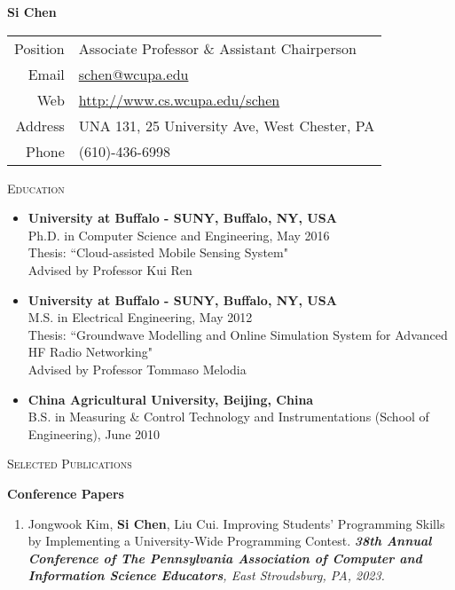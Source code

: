 \documentclass[letter]{article}
\newcommand{\heading}[1]{\item \large \textsc{#1} \normalsize}
\newcommand{\publication}[4]{\item #1. #2. \emph{#3.} #4}
\begin{document}
\Huge \textbf{Si Chen} \hfill \small
\begin{tabular}{rl}
Position & Associate Professor \& Assistant Chairperson\\
Email   & \href{mailto:schen@wcupa.edu}{schen@wcupa.edu} \\
Web     & \url{http://www.cs.wcupa.edu/schen} \\
Address & UNA 131, 25 University Ave, West Chester, PA\\
Phone  & (610)-436-6998\\
\end{tabular}

\normalsize

\begin{description}

\heading{Education}

\begin{itemize}
\item \textbf{University at Buffalo - SUNY, Buffalo, NY, USA} \\
Ph.D. in Computer Science and Engineering, May 2016\\
Thesis: ``Cloud-assisted Mobile Sensing System" \\
Advised by Professor Kui Ren

\item \textbf{University at Buffalo - SUNY, Buffalo, NY, USA} \\
M.S. in Electrical Engineering, May 2012\\
Thesis: ``Groundwave Modelling and Online Simulation System for Advanced HF Radio Networking" \\
Advised by Professor Tommaso Melodia

\item \textbf{China Agricultural University, Beijing, China} \\
B.S. in Measuring \& Control Technology and Instrumentations (School of Engineering), June 2010\\
\end{itemize}

\heading{Selected Publications}

\textbf{Conference Papers}

\begin{enumerate}[{C-}1.]

\publication{Jongwook Kim, \textbf{Si Chen}, Liu Cui} {Improving Students’ Programming Skills by Implementing a University-Wide Programming Contest} {\textbf{38th Annual Conference of The Pennsylvania Association of Computer and Information Science Educators}, East Stroudsburg, PA, 2023}\\


\end{enumerate}
\end{description}
\end{document}
